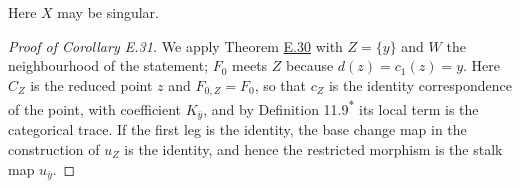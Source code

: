\documentclass[11pt]{article}
\newcommand{\bpout}[1]{#1\textsuperscript{\hyperlink{bp-outside}{\ensuremath{\ast}}}}
\begin{document}
\label{bp96}%
Here \(X\) may be singular.

\begin{proof}[{Proof of Corollary E.31}]\label{bp97}%
We apply Theorem \hyperref[bp91]{E.30} with \(Z=\{y\}\) and \(W\) the neighbourhood of the statement; \(F_0\) meets \(Z\) because \(d(z)=c_1(z)=y\). Here \(C_Z\) is the reduced point \(z\) and \(F_{0,Z}=F_0\), so that \(c_Z\) is the identity correspondence of the point, with coefficient \(K_{\bar y}\), and by Definition \bpout{11.9} its local term is the categorical trace. If the first leg is the identity, the base change map in the construction of \(u_Z\) is the identity, and hence the restricted morphism is the stalk map \(u_{\bar y}\).
\end{proof}



\clearpage{}\hypertarget{bp-outside}{}%
\end{document}

